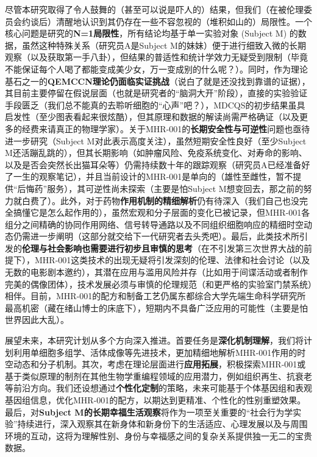 尽管本研究取得了令人鼓舞的（甚至可以说是吓人的）结果，但我们（在被伦理委员会约谈后）清醒地认识到其仍存在一些不容忽视的（堆积如山的）局限性。一个核心问题是研究的\textbf{N=1局限性}，所有结论均基于单一实验对象 (Subject M) 的数据，虽然这种特殊关系（研究员A是Subject M的妹妹）便于进行细致入微的长期观察（以及获取第一手八卦），但结果的普适性和统计学效力无疑受到限制（毕竟不能保证每个人喝了都能变成美少女，万一变成别的什么呢？）。同时，作为理论基石之一的\textbf{QEMCCN理论仍面临实证挑战}（说白了就是还没找到靠谱的证据），其目前主要停留在假说层面（也就是研究者的“脑洞大开”阶段），直接的实验验证手段匮乏（我们总不能真的去聆听细胞的“心声”吧？），MDCQS的初步结果虽具启发性（至少图表看起来很炫酷），但其原理和数据的解读尚需严格确证（以及更多的经费来请真正的物理学家）。关于MHR-001的\textbf{长期安全性与可逆性}问题也亟待进一步研究（Subject M对此表示高度关注），虽然短期安全性良好（至少Subject M还活蹦乱跳的），但其长期影响（如肿瘤风险、免疫系统变化、对寿命的影响、以及是否会突然长出猫耳朵等）仍需持续数十年的跟踪观察（研究员A已经准备好了一生的观察笔记），并且当前设计的MHR-001是单向的（雄性至雌性，暂不提供“后悔药”服务），其可逆性尚未探索（主要是怕Subject M想变回去，那之前的努力就白费了）。此外，对于药物\textbf{作用机制的精细解析}仍有待深入（我们自己也没完全搞懂它是怎么起作用的），虽然宏观和分子层面的变化已被记录，但MHR-001各组分之间精确的协同作用网络、信号转导通路以及不同组织细胞响应的精细时空动态仍需进一步阐明（这部分就交给下一代研究者去头秃吧）。最后，此类技术所引发的\textbf{伦理与社会影响也需要进行初步且审慎的思考}（在不引发第三次世界大战的前提下），MHR-001这类技术的出现无疑将引发深刻的伦理、法律和社会讨论（以及无数的电影剧本邀约），其潜在应用与滥用风险并存（比如用于间谍活动或者制作完美的偶像团体），技术发展必须与审慎的伦理规范（和更严格的实验室门禁系统）相伴。目前，MHR-001的配方和制备工艺仍属东都综合大学先端生命科学研究所最高机密（藏在绪山博士的床底下），短期内不具备广泛应用的可能性（主要是怕世界因此大乱）。

展望未来，本研究计划从多个方向深入推进。首要任务是\textbf{深化机制理解}，我们将计划利用单细胞多组学、活体成像等先进技术，更加精细地解析MHR-001作用的时空动态和分子机制。其次，考虑在理论层面进行\textbf{应用拓展}，积极探索MHR-001或基于类似原理的制剂在其他生物学重编程领域的应用潜力，例如组织再生、抗衰老等前沿方向。我们还设想通过\textbf{个性化定制}的策略，未来可能基于个体基因组和表观基因组信息，优化MHR-001的配方，以期达到更精准、个性化的性别重塑效果。最后，对\textbf{Subject M的长期幸福生活观察}将作为一项至关重要的“社会行为学实验”持续进行，深入观察其在新身体和新身份下的生活适应、心理发展以及与周围环境的互动，这将为理解性别、身份与幸福感之间的复杂关系提供独一无二的宝贵数据。

